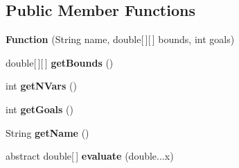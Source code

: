 \subsection*{Public Member Functions}
\begin{DoxyCompactItemize}
\item 
\hypertarget{classjenes_1_1tutorials_1_1old_1_1problem12_1_1_function_a9c5f78b0b4d831eebec0071baa79f8ee}{{\bfseries Function} (String name, double\mbox{[}$\,$\mbox{]}\mbox{[}$\,$\mbox{]} bounds, int goals)}\label{classjenes_1_1tutorials_1_1old_1_1problem12_1_1_function_a9c5f78b0b4d831eebec0071baa79f8ee}

\item 
\hypertarget{classjenes_1_1tutorials_1_1old_1_1problem12_1_1_function_ae97b45b0a6c1d5db782a138e06d2f076}{double\mbox{[}$\,$\mbox{]}\mbox{[}$\,$\mbox{]} {\bfseries get\-Bounds} ()}\label{classjenes_1_1tutorials_1_1old_1_1problem12_1_1_function_ae97b45b0a6c1d5db782a138e06d2f076}

\item 
\hypertarget{classjenes_1_1tutorials_1_1old_1_1problem12_1_1_function_af412a211a5270eb27376db8cd0bc704d}{int {\bfseries get\-N\-Vars} ()}\label{classjenes_1_1tutorials_1_1old_1_1problem12_1_1_function_af412a211a5270eb27376db8cd0bc704d}

\item 
\hypertarget{classjenes_1_1tutorials_1_1old_1_1problem12_1_1_function_ae5415395c7c1fde07fbc5581afa0273c}{int {\bfseries get\-Goals} ()}\label{classjenes_1_1tutorials_1_1old_1_1problem12_1_1_function_ae5415395c7c1fde07fbc5581afa0273c}

\item 
\hypertarget{classjenes_1_1tutorials_1_1old_1_1problem12_1_1_function_a48a0197bf768aca5fc8154613cd30e8d}{String {\bfseries get\-Name} ()}\label{classjenes_1_1tutorials_1_1old_1_1problem12_1_1_function_a48a0197bf768aca5fc8154613cd30e8d}

\item 
\hypertarget{classjenes_1_1tutorials_1_1old_1_1problem12_1_1_function_aa1f4a7947b903e4ae9b9617940d4ed03}{abstract double\mbox{[}$\,$\mbox{]} {\bfseries evaluate} (double...\-x)}\label{classjenes_1_1tutorials_1_1old_1_1problem12_1_1_function_aa1f4a7947b903e4ae9b9617940d4ed03}

\end{DoxyCompactItemize}
